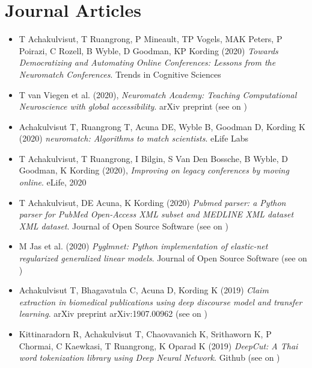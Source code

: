 \section{\sc Journal Articles}

\begin{itemize}[leftmargin=0cm, label={}]

\item T Achakulvisut, T Ruangrong, P Mineault, TP Vogels, MAK Peters, P Poirazi, C Rozell, B Wyble, D Goodman, KP Kording (2020) {\em Towards Democratizing and Automating Online Conferences: Lessons from the Neuromatch Conferences}. Trends in Cognitive Sciences

\item T van Viegen et al. (2020), {\em Neuromatch Academy: Teaching Computational Neuroscience with global accessibility}. arXiv preprint (see on \href{https://github.com/NeuromatchAcademy/course-content}{\faGithubAlt})

\item Achakulvisut T, Ruangrong T, Acuna DE, Wyble B,  Goodman D, Kording K (2020) {\em neuromatch: Algorithms to match scientists}. eLife Labs

\item T Achakulvisut, T Ruangrong, I Bilgin, S Van Den Bossche, B Wyble, D Goodman, K Kording (2020), {\em Improving on legacy conferences by moving online}. eLife, 2020

\item T Achakulvisut, DE Acuna, K Kording (2020) {\em Pubmed parser: a Python parser for PubMed Open-Access XML subset and MEDLINE XML dataset XML dataset}. Journal of Open Source Software (see on \href{https://github.com/titipata/pubmed_parser}{\faGithubAlt})

\item M Jas et al. (2020) {\em Pyglmnet: Python implementation of elastic-net regularized generalized linear models}. Journal of Open Source Software (see on \href{https://github.com/glm-tools/pyglmnet}{\faGithubAlt})

\item Achakulvisut T, Bhagavatula C, Acuna D, Kording K (2019) {\em Claim extraction in biomedical publications using deep discourse model and transfer learning}. arXiv preprint arXiv:1907.00962 (see on \href{https://github.com/titipata/detecting-scientific-claim}{\faGithubAlt})

\item Kittinaradorn R, Achakulvisut T, Chaovavanich K, Srithaworn K, P Chormai, C Kaewkasi, T Ruangrong, K Oparad K (2019) {\em  DeepCut: A Thai word tokenization library using Deep Neural Network}. Github (see on \href{https://github.com/rkcosmos/deepcut}{\faGithubAlt})


\end{itemize}

